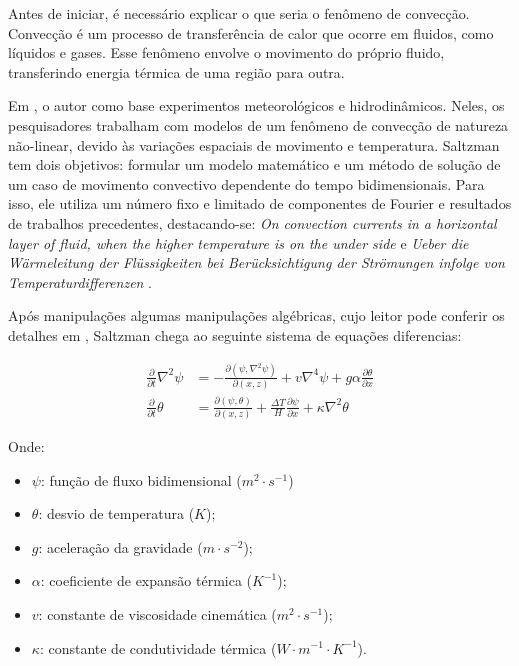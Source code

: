 \documentclass[12pt, a4paper]{article}
\begin{document}
Antes de iniciar, é necessário explicar o que seria o fenômeno de
convecção. Convecção é um processo de transferência de calor que ocorre em
fluidos, como líquidos e gases. Esse fenômeno envolve o movimento do próprio
fluido, transferindo energia térmica de uma região para outra.

Em \cite{Saltzman1962}, o autor como base experimentos meteorológicos e
hidrodinâmicos. Neles, os pesquisadores trabalham com modelos de um fenômeno de
convecção de natureza não-linear, devido às variações espaciais de movimento e
temperatura. Saltzman tem dois objetivos: formular um modelo matemático e um
método de solução de um caso de movimento convectivo dependente do tempo
bidimensionais. Para isso, ele utiliza um número fixo e limitado de componentes
de Fourier e resultados de trabalhos precedentes, destacando-se: \textit{On
    convection currents in a horizontal layer of fluid, when the higher
    temperature
    is on the under side} \cite{Rayleigh1916} e \textit{Ueber die Wärmeleitung
    der
    Flüssigkeiten bei Berücksichtigung der Strömungen infolge von
    Temperaturdifferenzen} \cite{Oberbeck1879}.

Após manipulações algumas manipulações algébricas, cujo leitor pode
conferir os detalhes em \cite{Saltzman1962}, Saltzman chega ao seguinte sistema
de equações diferencias:

\begin{align}
    \frac{\partial}{\partial t} \nabla^2 \psi & = - \frac{\partial (\psi,
        \nabla^2 \psi)}{\partial (x,z)} + v \nabla^4 \psi + g \alpha
    \frac{\partial
    \theta}{\partial x} \label{saltzman-1}                                \\
    \frac{\partial}{\partial t} \theta        & = \frac{\partial (\psi,
        \theta)}{\partial (x,z)} + \frac{\Delta T}{H} \frac{\partial
        \psi}{\partial x}
    + \kappa \nabla^2 \theta \label{saltzman-2}
\end{align}

Onde:
\begin{itemize}
    \item $\psi$: função de fluxo bidimensional ($m^2 \cdot s^{-1}$)
    \item $\theta$: desvio de temperatura ($K$);
    \item $g$: aceleração da gravidade ($m \cdot s^{-2}$);
    \item $\alpha$: coeficiente de expansão térmica ($K^{-1}$);
    \item $v$: constante de viscosidade cinemática ($m^2 \cdot s^{-1}$);
    \item $\kappa$: constante de condutividade térmica ($W \cdot m^{-1}
              \cdot K^{-1}$).
\end{itemize}
\end{document}
